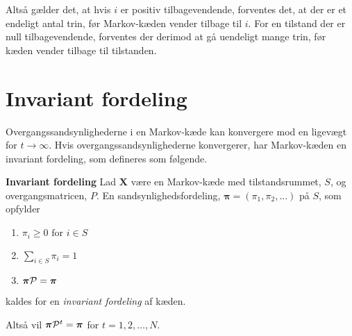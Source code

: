 Altså gælder det, at hvis $i$ er positiv tilbagevendende, forventes det, at der er et endeligt antal trin, før Markov-kæden vender tilbage til $i$. For en tilstand der er null tilbagevendende, forventes der derimod at gå uendeligt mange trin, før kæden vender tilbage til tilstanden. 




          



\section{Invariant fordeling}
Overgangssandsynlighederne i en Markov-kæde kan konvergere mod en ligevægt for $t \to \infty$. Hvis overgangssandsynlighederne konvergerer, har Markov-kæden en invariant fordeling, som defineres som følgende.
%
\begin{defn}\textbf{Invariant fordeling} \label{defn: invariant_fordeling} %
\newline 
Lad $\bm X$ være en Markov-kæde med tilstandsrummet, $S$, og overgangsmatricen, $P$. En sandsynlighedsfordeling, $\bm\pi=(\pi_1,\pi_2,\dots)$ på $S$, som opfylder
\begin{enumerate}
    \item $\pi_i\geq 0 \text{ for } i\in S$
    \item $\displaystyle\sum_{i\in S} \pi_i=1$
    \item $\bm\pi \mathcal{P}=\bm\pi$
\end{enumerate}
kaldes for en \textit{invariant fordeling} af kæden. 
\end{defn}
Altså vil $\bm \pi \mathcal{P}^t = \bm\pi$ for $t = 1, 2, \ldots, N$. 

